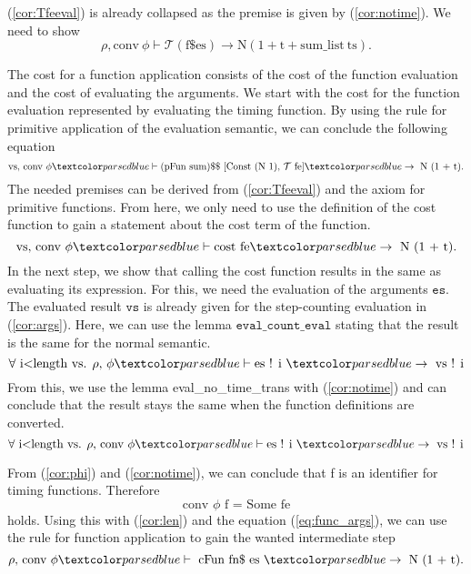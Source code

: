 (\ref{cor:Tfeeval}) is already collapsed as the premise is given by (\ref{cor:notime}).
We need to show
\begin{equation*}
  \rho, \text{conv}\ \phi \vdash\mathcal{T} (\text{f\$ es})\rightarrow \text{N} (1 + \text{t} + \text{sum\_list}\ \text{ts}).
\end{equation*}

The cost for a function application consists of the cost of the function evaluation and the cost of evaluating the arguments.
We start with the cost for the function evaluation represented by evaluating the timing function.
By using the rule for primitive application of the evaluation semantic, we can conclude the following equation
\begin{equation*}
\text{vs, conv } \phi \hvdash \text{(pFun sum)\$\$ } [  \text{Const (N 1), } \mathcal{T}\ \text{fe} ] \hrightarrow \text{ N (1 + t)}.
\end{equation*}
The needed premises can be derived from (\ref{cor:Tfeeval}) and the axiom for primitive functions. From here, we only need to use the definition of the cost function to gain a statement about the cost term of the function.
\begin{equation}
\text{vs, conv } \phi \hvdash \text{cost fe} \hrightarrow \text{ N (1 + t)}.
\end{equation}
In the next step, we show that calling the cost function results in the same as evaluating its expression.
For this, we need the evaluation of the arguments $\texttt{es}$.
The evaluated result $\texttt{vs}$ is already given for the step-counting evaluation in (\ref{cor:args}).
Here, we can use the lemma $\texttt{eval\_count\_eval}$ stating that the result is the same for the normal semantic.
\begin{equation*}
\forall \text{ i<length vs. } \rho \text{, } \phi \hvdash \text{es ! i } \hrightarrow \text{ vs ! i}
\end{equation*}
From this, we use the lemma eval\_no\_time\_trans with (\ref{cor:notime}) and can conclude that the result stays the same when the function definitions are converted.
\begin{equation} \label{eq:func_args}
\forall \text{ i<length vs. } \rho \text{, conv}\ \phi \hvdash \text{es ! i } \hrightarrow \text{ vs ! i}
\end{equation}

From (\ref{cor:phi}) and (\ref{cor:notime}), we can conclude that f is an identifier for timing functions. Therefore
\begin{equation*}
  \text{conv } \phi \text{ f = Some fe}
\end{equation*}
holds.
Using this with (\ref{cor:len}) and the equation (\ref{eq:func_args}), we can use the rule for function application to gain the wanted intermediate step
\begin{equation} \label{eq:func_id}
  \rho \text{, conv }\phi \hvdash \text{ cFun fn\$ es } \hrightarrow \text{ N (1 + t).}
\end{equation}

